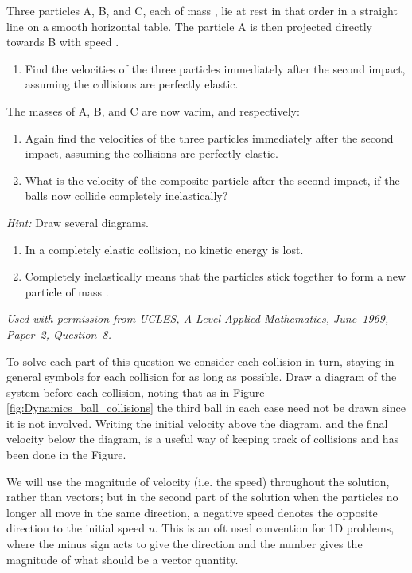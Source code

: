 
\begin{problem}[A1969AMIIQ8l] %
{Three particles A, B, and C, each of mass , lie at rest in that order in a straight line on a smooth horizontal table. The particle A is then projected directly towards B with speed . 
\begin{enumerate}
	\item Find the velocities of the three particles immediately after the second impact, assuming the collisions are perfectly elastic.
\end{enumerate}
The masses of A, B, and C are now vari{m},  and  respectively:
\begin{enumerate}[resume]
	\item Again find the velocities of the three particles immediately after the second impact, assuming the collisions are perfectly elastic.
	\item What is the velocity of the composite particle after the second impact, if the balls now collide completely inelastically?
\end{enumerate}

\emph{Hint:} Draw several diagrams.
\begin{enumerate}
	\item In a completely elastic collision, no kinetic energy is lost.
	\item Completely inelastically means that the particles stick together to form a new particle of mass .
\end{enumerate}
}
{\textit{Used with permission from UCLES, A Level Applied Mathematics, June~1969, Paper~2, Question~8.}}
{To solve each part of this question we consider each collision in turn, staying in general symbols for each collision for as long as possible. Draw a diagram of the system before each collision, noting that as in Figure \ref{fig:Dynamics_ball_collisions} the third ball in each case need not be drawn since it is not involved. Writing the initial velocity above the diagram, and the final velocity below the diagram, is a useful way of keeping track of collisions and has been done in the Figure. 

We will use the magnitude of velocity (i.e. the speed) throughout the solution, rather than vectors; but in the second part of the solution when the particles no longer all move in the same direction, a negative speed denotes the opposite direction to the initial speed $u$. This is an oft used convention for 1D problems, where the minus sign acts to give the direction and the number gives the magnitude of what should be a vector quantity.

}
\end{problem}
